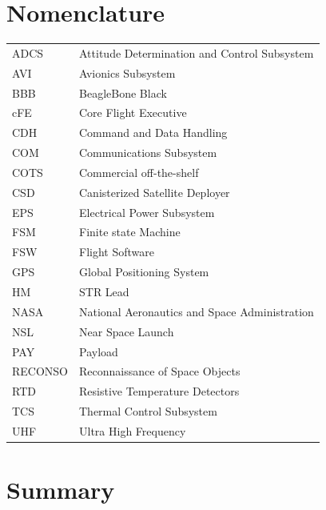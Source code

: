 \documentclass{article}
\begin{document}
\newpage
\section*{\centering Nomenclature}
\vspace{0.5in}
\begin{center}
	\begin{tabular}{l l}
		ADCS 	  &  Attitude Determination and Control Subsystem  \\ 
		AVI    &  Avionics Subsystem     \\ 
		BBB & BeagleBone Black      \\ 
		cFE & Core Flight Executive  \\ 	
		CDH	      & Command and Data Handling  \\ 
		COM     & Communications Subsystem  \\ 
		COTS    & Commercial off-the-shelf   \\ 
		CSD  & Canisterized Satellite Deployer  \\ 
		EPS        & Electrical Power Subsystem   \\ 
		FSM	 & Finite state Machine \\ 
		FSW     & Flight Software   \\ 
		GPS  &  Global Positioning System \\ 
		HM     & STR Lead   \\ 
		NASA  & National Aeronautics and Space Administration \\ 
		NSL      &  Near Space Launch   \\ 
		PAY  & Payload \\ 
		RECONSO & Reconnaissance of Space Objects \\
		RTD  & Resistive Temperature Detectors \\ 
		TCS & Thermal Control Subsystem \\ 
		UHF & Ultra High Frequency \\ 
		
		
	\end{tabular}
\end{center}

\newpage
\section*{Summary}
\end{document}
